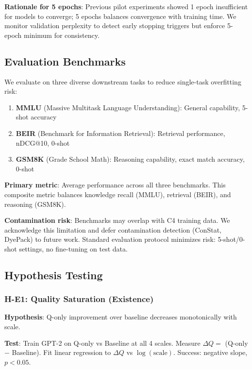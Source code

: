 \textbf{Rationale for 5 epochs}: Previous pilot experiments showed 1 epoch insufficient for models to converge; 5 epochs balances convergence with training time. We monitor validation perplexity to detect early stopping triggers but enforce 5-epoch minimum for consistency.

\subsection{Evaluation Benchmarks}

We evaluate on three diverse downstream tasks to reduce single-task overfitting risk:

\begin{enumerate}
\item \textbf{MMLU} (Massive Multitask Language Understanding): General capability, 5-shot accuracy
\item \textbf{BEIR} (Benchmark for Information Retrieval): Retrieval performance, nDCG@10, 0-shot
\item \textbf{GSM8K} (Grade School Math): Reasoning capability, exact match accuracy, 0-shot
\end{enumerate}

\textbf{Primary metric}: Average performance across all three benchmarks. This composite metric balances knowledge recall (MMLU), retrieval (BEIR), and reasoning (GSM8K).

\textbf{Contamination risk}: Benchmarks may overlap with C4 training data. We acknowledge this limitation and defer contamination detection (ConStat, DyePack) to future work. Standard evaluation protocol minimizes risk: 5-shot/0-shot settings, no fine-tuning on test data.

\subsection{Hypothesis Testing}

\subsubsection{H-E1: Quality Saturation (Existence)}

\textbf{Hypothesis}: Q-only improvement over baseline decreases monotonically with scale.

\textbf{Test}: Train GPT-2 on Q-only vs Baseline at all 4 scales. Measure $\Delta Q = $ (Q-only $-$ Baseline). Fit linear regression to $\Delta Q$ vs $\log(\text{scale})$. Success: negative slope, $p < 0.05$.

